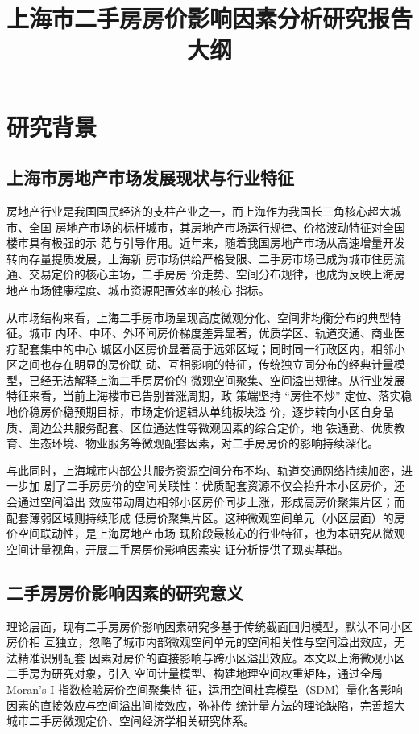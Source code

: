 \documentclass[UTF8]{ctexart}
\title{上海市二手房房价影响因素分析研究报告大纲}
\begin{document}
\maketitle%
\newpage%
\tableofcontents%
\newpage

\section{研究背景} 

\subsection{上海市房地产市场发展现状与行业特征} 

房地产行业是我国国民经济的支柱产业之一，而上海作为我国长三角核心超大城市、全国
房地产市场的标杆城市，其房地产市场运行规律、价格波动特征对全国楼市具有极强的示
范与引导作用。近年来，随着我国房地产市场从高速增量开发转向存量提质发展，上海新
房市场供给严格受限、二手房市场已成为城市住房流通、交易定价的核心主场，二手房房
价走势、空间分布规律，也成为反映上海房地产市场健康程度、城市资源配置效率的核心
指标。

从市场结构来看，上海二手房市场呈现高度微观分化、空间非均衡分布的典型特征。城市
内环、中环、外环间房价梯度差异显著，优质学区、轨道交通、商业医疗配套集中的中心
城区小区房价显著高于远郊区域；同时同一行政区内，相邻小区之间也存在明显的房价联
动、互相影响的特征，传统独立同分布的经典计量模型，已经无法解释上海二手房房价的
微观空间聚集、空间溢出规律。从行业发展特征来看，当前上海楼市已告别普涨周期，政
策端坚持 “房住不炒” 定位、落实稳地价稳房价稳预期目标，市场定价逻辑从单纯板块溢
价，逐步转向小区自身品质、周边公共服务配套、区位通达性等微观因素的综合定价，地
铁通勤、优质教育、生态环境、物业服务等微观配套因素，对二手房房价的影响持续深化。

与此同时，上海城市内部公共服务资源空间分布不均、轨道交通网络持续加密，进一步加
剧了二手房房价的空间关联性：优质配套资源不仅会抬升本小区房价，还会通过空间溢出
效应带动周边相邻小区房价同步上涨，形成高房价聚集片区；而配套薄弱区域则持续形成
低房价聚集片区。这种微观空间单元（小区层面）的房价空间联动性，是上海房地产市场
现阶段最核心的行业特征，也为本研究从微观空间计量视角，开展二手房房价影响因素实
证分析提供了现实基础。

\subsection{二手房房价影响因素的研究意义} 

理论层面，现有二手房房价影响因素研究多基于传统截面回归模型，默认不同小区房价相
互独立，忽略了城市内部微观空间单元的空间相关性与空间溢出效应，无法精准识别配套
因素对房价的直接影响与跨小区溢出效应。本文以上海微观小区二手房为研究对象，引入
空间计量模型、构建地理空间权重矩阵，通过全局 Moran's I 指数检验房价空间聚集特
征，运用空间杜宾模型（SDM）量化各影响因素的直接效应与空间溢出间接效应，弥补传
统计量方法的理论缺陷，完善超大城市二手房微观定价、空间经济学相关研究体系。
\end{document}
